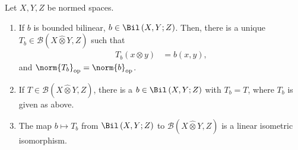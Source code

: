 \documentclass[10pt]{mypackage}
\begin{document}
\begin{proposition}
  Let $X,Y,Z$ be normed spaces.
  \begin{enumerate}[(1)]
    \item If $b$ is bounded bilinear, $b\in \Bil\left(X,Y;Z\right)$. Then, there is a unique $T_{b}\in \mathcal{B}\left(X\hat\otimes Y,Z\right)$ such that
      \begin{align*}
        T_{b}\left(x\otimes y\right) &= b\left(x,y\right),
      \end{align*}
      and $\norm{T_{b}}_{\text{op}} = \norm{b}_{\text{op}}$.
    \item If $T\in \mathcal{B}\left(X\hat\otimes Y,Z\right)$, there is a $b\in \Bil\left(X,Y;Z\right)$ with $T_b = T$, where $T_b$ is given as above.
    \item The map $b \mapsto T_{b}$ from $\Bil\left(X,Y;Z\right)$ to $\mathcal{B}\left(X\hat\otimes Y,Z\right)$ is a linear isometric isomorphism.
  \end{enumerate}
\end{proposition}
\end{document}
